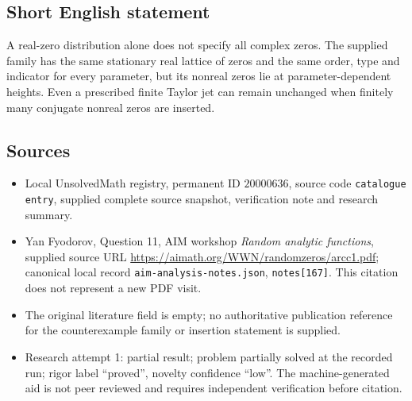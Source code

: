 \documentclass[11pt]{article}
\begin{document}
\subsection{Short English statement}
A real-zero distribution alone does not specify all complex zeros. The supplied family has the same stationary real lattice of zeros and the same order, type and indicator for every parameter, but its nonreal zeros lie at parameter-dependent heights. Even a prescribed finite Taylor jet can remain unchanged when finitely many conjugate nonreal zeros are inserted.
\subsection{Sources}
\begin{itemize}
\item Local UnsolvedMath registry, permanent ID $20000636$, source code \texttt{catalogue entry}, supplied complete source snapshot, verification note and research summary.
\item Yan Fyodorov, Question 11, AIM workshop \emph{Random analytic functions}, supplied source URL \url{https://aimath.org/WWN/randomzeros/arcc1.pdf}; canonical local record \texttt{aim-analysis-notes.json}, \texttt{notes[167]}. This citation does not represent a new PDF visit.
\item The original literature field is empty; no authoritative publication reference for the counterexample family or insertion statement is supplied.
\item Research attempt 1: partial result; problem partially solved at the recorded run; rigor label ``proved'', novelty confidence ``low''. The machine-generated aid is not peer reviewed and requires independent verification before citation.
\end{itemize}
\end{document}
